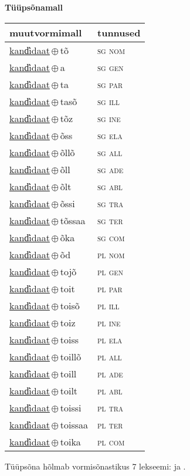 

\vspace{3.5em}
\noindent \begin{minipage}{\textwidth}
\noindent \textbf{Tüüpsõnamall \,}\\

\begin{sideways}
\begin{tabular}{l l}
muutvormimall & tunnused \\
\hline
\underline{kand̕idaat}\,$\oplus$\,tõ & \textsc{ sg nom } \\
\underline{kand̕idaat}\,$\oplus$\,a & \textsc{ sg gen } \\
\underline{kand̕idaat}\,$\oplus$\,ta & \textsc{ sg par } \\
\underline{kand̕idaat}\,$\oplus$\,tasõ & \textsc{ sg ill } \\
\underline{kand̕idaat}\,$\oplus$\,tõz & \textsc{ sg ine } \\
\underline{kand̕idaat}\,$\oplus$\,õss & \textsc{ sg ela } \\
\underline{kand̕idaat}\,$\oplus$\,õllõ & \textsc{ sg all } \\
\underline{kand̕idaat}\,$\oplus$\,õll & \textsc{ sg ade } \\
\underline{kand̕idaat}\,$\oplus$\,õlt & \textsc{ sg abl } \\
\underline{kand̕idaat}\,$\oplus$\,õssi & \textsc{ sg tra } \\
\underline{kand̕idaat}\,$\oplus$\,tõssaa & \textsc{ sg ter } \\
\underline{kand̕idaat}\,$\oplus$\,õka & \textsc{ sg com } \\
\underline{kand̕idaat}\,$\oplus$\,õd & \textsc{ pl nom } \\
\underline{kand̕idaat}\,$\oplus$\,tojõ & \textsc{ pl gen } \\
\underline{kand̕idaat}\,$\oplus$\,toit & \textsc{ pl par } \\
\underline{kand̕idaat}\,$\oplus$\,toisõ & \textsc{ pl ill } \\
\underline{kand̕idaat}\,$\oplus$\,toiz & \textsc{ pl ine } \\
\underline{kand̕idaat}\,$\oplus$\,toiss & \textsc{ pl ela } \\
\underline{kand̕idaat}\,$\oplus$\,toillõ & \textsc{ pl all } \\
\underline{kand̕idaat}\,$\oplus$\,toill & \textsc{ pl ade } \\
\underline{kand̕idaat}\,$\oplus$\,toilt & \textsc{ pl abl } \\
\underline{kand̕idaat}\,$\oplus$\,toissi & \textsc{ pl tra } \\
\underline{kand̕idaat}\,$\oplus$\,toissaa & \textsc{ pl ter } \\
\underline{kand̕idaat}\,$\oplus$\,toika & \textsc{ pl com } \\
\end{tabular}
\end{sideways}
\label{tab:tüüpsõnamall-kand̕idaattõ}

\end{minipage}

 
\vspace{1em}
\noindent Tüüpsõna hõlmab vormisõnastikus 7 lekseemi:  ja .

